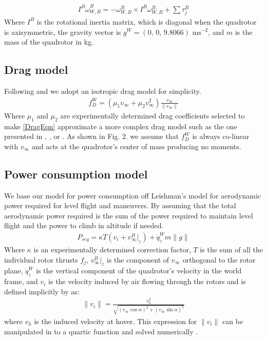 \begin{align}
    \label{EulerEqn}
     I^B\dot{\omega}_{W,B}^B=-\omega_{W,B}^B \times I^B\omega_{W,B}^B+\sum{\tau_j^B}
\end{align}
Where $I^B$ is the rotational inertia matrix, which is diagonal when the quadrotor is axisymmetric, the gravity vector is $g^W=\left(0 \text{, } 0 \text{, } 9.8066\right) \text{ ms}^{-2}$, and $m$ is the mass of the quadrotor in kg.

\subsection{Drag model}
Following \cite{tagliabue2019model} and \cite{schulz2015high} we adopt an isotropic drag model for simplicity.
\begin{align}
    \label{DragEqn}
    f_D^W = \left(\mu_1 v_\infty + \mu_2 v_\infty^2 \right)\frac{v_\infty}{\|v_\infty\|} 
\end{align}
Where $\mu_1$ and $\mu_2$ are experimentally determined drag coefficients selected to make \eqref{DragEqn} approximate a more complex drag model such as the one presented in \cite{huang2009aerodynamics}, \cite{bangura2012nonlinear}, or \cite{leishman2014quadrotors}. As shown in Fig. 2. we assume that $f_D^W$ is always co-linear with $v_\infty$ and acts at the quadrotor's center of mass producing no moments.

\subsection{Power consumption model}
We base our model for power consumption off Leishman's \cite{leishman2006principles} model for aerodynamic power required for level flight and maneuvers. By assuming that the total aerodynamic power required is the sum of the power required to maintain level flight and the power to climb in altitude if needed.
\begin{align}
    \label{PowReqEqn}
    P_{req} = \kappa T \left(v_i + v_\infty^B|_z \right) + \dot{q}^W_z m \|g\|
\end{align}
Where $\kappa$ is an experimentally determined correction factor, $T$ is the sum of all the individual rotor thrusts $f_j$, $v_\infty^B|_z$ is the component of $v_\infty$ orthogonal to the rotor plane, $\dot{q}^W_z$ is the vertical component of the quadrotor's velocity in the world frame, and $v_i$ is the velocity induced by air flowing through the rotors and is defined implicitly by \cite{leishman2006principles} as: 
\begin{align}
    \|v_i\| = \frac{v_h^2}{\sqrt{\left(v_\infty \cos{\alpha} \right)^2 + \left(v_\infty \sin{\alpha} \right)^2}}
\end{align}
where $v_h$ is the induced velocity at hover. This expression for $\|v_i\|$ can be manipulated in to a quartic function and solved numerically \cite{hoffmann2007quadrotor}.

